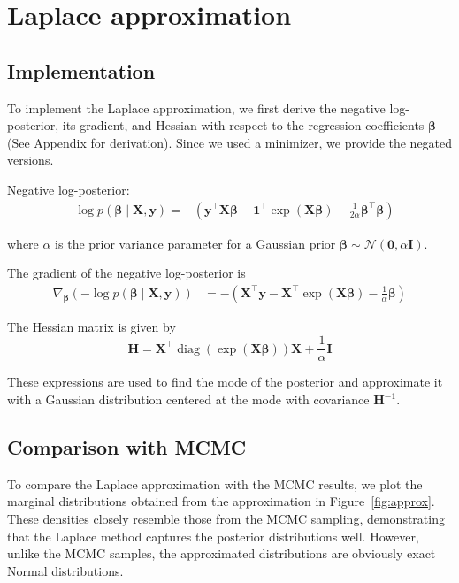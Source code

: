\documentclass[9pt]{IEEEtran}
\begin{document}
\section{Laplace approximation}
\subsection{Implementation}
To implement the Laplace approximation, we 
first derive the negative log-posterior, its gradient,
 and Hessian with respect to the regression coefficients
  \(\boldsymbol{\beta}\) (See Appendix for derivation).
   Since we used a minimizer, we provide
  the negated versions.

Negative log-posterior: 
\begin{align}
-\log p(\boldsymbol{\beta} \mid \mathbf{X}, \mathbf{y}) 
= - \left( \mathbf{y}^\top \mathbf{X}\boldsymbol{\beta} - \mathbf{1}^\top \exp(\mathbf{X}\boldsymbol{\beta}) - \frac{1}{2\alpha} \boldsymbol{\beta}^\top \boldsymbol{\beta} \right)
\end{align}

\noindent where \(\alpha\) is the prior variance parameter for a Gaussian prior \(\boldsymbol{\beta} \sim \mathcal{N}(\mathbf{0}, \alpha \mathbf{I})\).

\noindent The gradient of the negative log-posterior is
\begin{align}
\nabla_{\boldsymbol{\beta}} \left( -\log p(\boldsymbol{\beta} \mid \mathbf{X}, \mathbf{y}) \right) 
&= - \left( \mathbf{X}^\top \mathbf{y} - \mathbf{X}^\top \exp(\mathbf{X}\boldsymbol{\beta}) - \frac{1}{\alpha} \boldsymbol{\beta} \right)
\end{align}

\noindent The Hessian matrix is given by
\[
\mathbf{H} = \mathbf{X}^\top \operatorname{diag}\left(\exp(\mathbf{X}\boldsymbol{\beta})\right) \mathbf{X} + \frac{1}{\alpha} \mathbf{I}
\]


These expressions are used to find the mode of the posterior
 and approximate it with a Gaussian distribution centered at 
 the mode with covariance \(\mathbf{H}^{-1}\).

\subsection{Comparison with MCMC}
To compare the Laplace approximation with the MCMC results, we plot
 the marginal distributions obtained from the approximation in 
 Figure~\ref{fig:approx}. These densities closely resemble those 
 from the MCMC sampling, demonstrating that the Laplace method 
 captures the posterior distributions well. However, unlike the
  MCMC samples, the approximated distributions are obviously exact Normal
   distributions.
\end{document}
